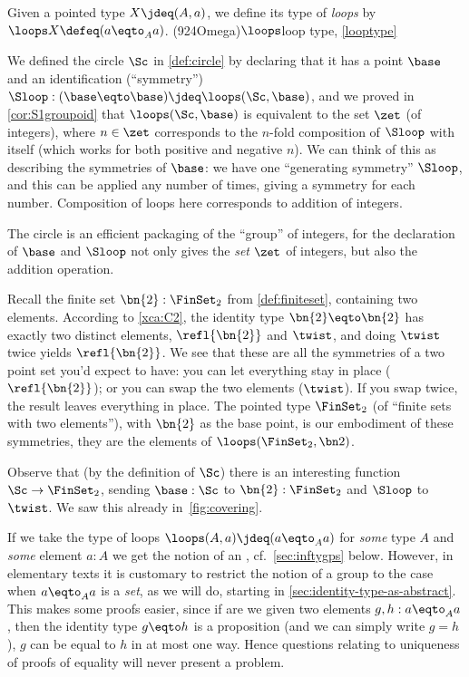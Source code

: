 \begin{definition}\label{looptype}
  Given a pointed type $X\jdeq(A,a)$, we define its type of \emph{loops}
  by $\loops X \defeq (a \eqto_A a)$.%
  \glossary(924Omega){$\protect\loops$}{loop type, \cref{looptype}}
\end{definition}
\begin{example}\label{ex:base=base}
  We defined the circle $\Sc$ in \cref{def:circle} by declaring
  that it has a point $\base$ and an identification (``symmetry'')
  $\Sloop:(\base\eqto\base) \jdeq \loops(\Sc,\base)$,
  and we proved in \cref{cor:S1groupoid} that $\loops(\Sc,\base)$ is equivalent
  to the set $\zet$ (of integers),
  where $n\in\zet$ corresponds to the $n$-fold composition of $\Sloop$ with itself
  (which works for both positive and negative $n$).
  We can think of this as describing the symmetries of $\base$:
  we have one ``generating symmetry'' $\Sloop$,
  and this can be applied any number of times,
  giving a symmetry for each number.
  Composition of loops here corresponds to addition of integers.

  The circle is an efficient packaging of the ``{group}'' of integers, for the declaration of $\base$ and $\Sloop$ not only gives the \emph{set}
  $\zet$ of integers, but also the addition operation.
\end{example}
\begin{example}
  Recall the finite set $\bn{2}:\FinSet_2$ from \cref{def:finiteset}, containing two elements.
  According to \cref{xca:C2}, the identity type $\bn{2} \eqto\bn{2} $ has exactly two distinct elements,
  $\refl{\bn{2}}$ and $\twist$,
  and doing $\twist$ twice yields $\refl{\bn{2}}$.
  We see that these are all the symmetries
  of a two point set you'd expect to have:
  you can let everything stay in place ($\refl{\bn{2}}$);
  or you can swap the two elements ($\twist$).
  If you swap twice, the result leaves everything in place.
  The pointed type $\FinSet_2$ (of ``finite sets with two elements''),
  with $\bn{2}$ as the base point,
  is our embodiment of these symmetries, \ie they are the elements of $\loops(\FinSet_2,\bn 2)$.

  Observe that (by the definition of $\Sc$)
  there is an interesting function $\Sc\to\FinSet_2$,
  sending $\base:\Sc$ to $\bn{2} :\FinSet_2$ and $\Sloop$ to $\twist$.
  We saw this already in~\cref{fig:covering}.
\end{example}

If we take the type of loops $\loops(A,a) \jdeq (a\eqto_Aa)$
for \emph{some} type $A$ and \emph{some} element $a:A$
we get the notion of an \inftygp, cf.~\cref{sec:inftygps} below.
However, in elementary texts it is customary to restrict the notion of a group to the case when $a\eqto_Aa$ is a \emph{set}, as we will do, starting in \cref{sec:identity-type-as-abstract}.
This makes some proofs easier, since if are we given two elements $g,h:a\eqto_Aa$, then the identity type $g\eqto h$ is a proposition (and we can simply write $g = h$), \ie $g$ can be equal to $h$ in at most one way.  Hence questions relating to uniqueness of proofs of equality will never present a problem.

